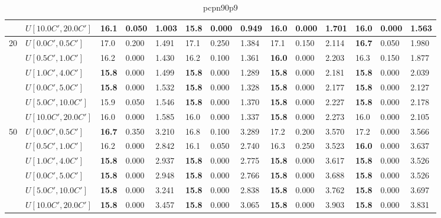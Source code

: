 \begin{table}[h]
{\begin{tabular}{|l|l||l|l|l||l|l|l||l|l|l||l|l|l|}
       & $U[10.0C',20.0C']$ & 16.1 & 0.050 & 1.003 & \textbf{15.8} & 0.000 & 0.949 & 16.0 & 0.000 & 1.701 & 16.0 & 0.000 & 1.563 \\
      \hline\hline
      \multirow{6}{*}{20} & $U[0.0C',0.5C']$ & 17.0 & 0.200 & 1.491 & 17.1 & 0.250 & 1.384 & 17.1 & 0.150 & 2.114 & \textbf{16.7} & 0.050 & 1.980 \\
       & $U[0.5C',1.0C']$ & 16.2 & 0.000 & 1.430 & 16.2 & 0.100 & 1.361 & \textbf{16.0} & 0.000 & 2.203 & 16.3 & 0.150 & 1.877 \\
       & $U[1.0C',4.0C']$ & \textbf{15.8} & 0.000 & 1.499 & \textbf{15.8} & 0.000 & 1.289 & \textbf{15.8} & 0.000 & 2.181 & \textbf{15.8} & 0.000 & 2.039 \\
       & $U[0.0C',5.0C']$ & \textbf{15.8} & 0.000 & 1.532 & \textbf{15.8} & 0.000 & 1.328 & \textbf{15.8} & 0.000 & 2.177 & \textbf{15.8} & 0.000 & 2.127 \\
       & $U[5.0C',10.0C']$ & 15.9 & 0.050 & 1.546 & \textbf{15.8} & 0.000 & 1.370 & \textbf{15.8} & 0.000 & 2.227 & \textbf{15.8} & 0.000 & 2.178 \\
       & $U[10.0C',20.0C']$ & 16.0 & 0.000 & 1.585 & 16.0 & 0.000 & 1.337 & \textbf{15.8} & 0.000 & 2.273 & 16.0 & 0.000 & 2.105 \\
      \hline\hline
      \multirow{6}{*}{50} & $U[0.0C',0.5C']$ & \textbf{16.7} & 0.350 & 3.210 & 16.8 & 0.100 & 3.289 & 17.2 & 0.200 & 3.570 & 17.2 & 0.000 & 3.566 \\
       & $U[0.5C',1.0C']$ & 16.2 & 0.000 & 2.842 & 16.1 & 0.050 & 2.740 & 16.3 & 0.250 & 3.523 & \textbf{16.0} & 0.000 & 3.637 \\
       & $U[1.0C',4.0C']$ & \textbf{15.8} & 0.000 & 2.937 & \textbf{15.8} & 0.000 & 2.775 & \textbf{15.8} & 0.000 & 3.617 & \textbf{15.8} & 0.000 & 3.526 \\
       & $U[0.0C',5.0C']$ & \textbf{15.8} & 0.000 & 2.948 & \textbf{15.8} & 0.000 & 2.766 & \textbf{15.8} & 0.000 & 3.688 & \textbf{15.8} & 0.000 & 3.526 \\
       & $U[5.0C',10.0C']$ & \textbf{15.8} & 0.000 & 3.241 & \textbf{15.8} & 0.000 & 2.838 & \textbf{15.8} & 0.000 & 3.762 & \textbf{15.8} & 0.000 & 3.697 \\
       & $U[10.0C',20.0C']$ & \textbf{15.8} & 0.000 & 3.457 & \textbf{15.8} & 0.000 & 3.065 & \textbf{15.8} & 0.000 & 3.903 & \textbf{15.8} & 0.000 & 3.831 \\
      \hline
      \end{tabular}
      }
      \caption{pcpn90p9}
      \label{tab:pcpn90p9}\end{table}
      
